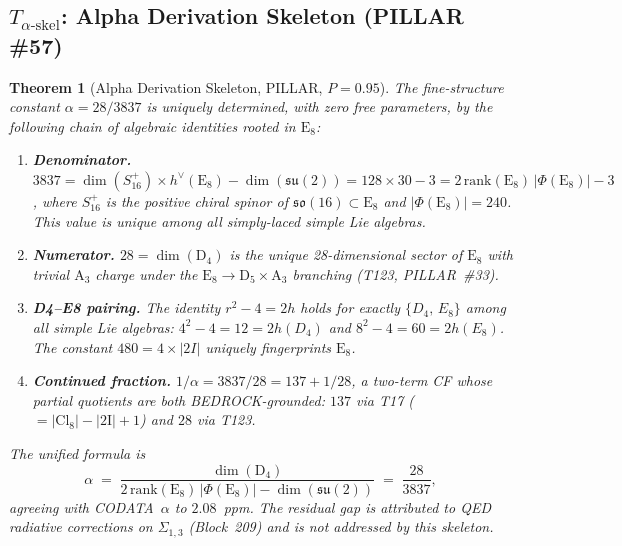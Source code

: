 \documentclass[aps,prd,twocolumn,superscriptaddress,floatfix,nofootinbib]{revtex4-2}
\newtheorem{theorem}{Theorem}
\theoremstyle{definition}
\theoremstyle{remark}
\begin{document}
\subsection{$T_{\alpha\text{-skel}}$: Alpha Derivation Skeleton (PILLAR \#57)}
\label{sec:t-alpha-skeleton}

\begin{theorem}[Alpha Derivation Skeleton, PILLAR, $P{=}0.95$]
\label{thm:t-alpha-skel}
The fine-structure constant $\alpha = 28/3837$ is uniquely determined, with
zero free parameters, by the following chain of algebraic identities rooted
in $\mathrm{E}_8$:
\begin{enumerate}
\item \textbf{Denominator.}  $3837 = \dim(S^+_{16})\times h^\vee(\mathrm{E}_8)
      - \dim(\mathfrak{su}(2)) = 128\times 30 - 3
      = 2\,\mathrm{rank}(\mathrm{E}_8)\,|\Phi(\mathrm{E}_8)| - 3$,
      where $S^+_{16}$ is the positive chiral spinor of $\mathfrak{so}(16)\subset\mathrm{E}_8$
      and $|\Phi(\mathrm{E}_8)|=240$.
      This value is unique among all simply-laced simple Lie algebras.
\item \textbf{Numerator.}  $28 = \dim(\mathrm{D}_4)$ is the unique 28-dimensional
      sector of $\mathrm{E}_8$ with trivial $\mathrm{A}_3$ charge under the
      $\mathrm{E}_8\to\mathrm{D}_5\times\mathrm{A}_3$ branching (T123, PILLAR~\#33).
\item \textbf{D4--E8 pairing.}  The identity $r^2-4 = 2h$ holds for exactly
      $\{D_4,\,E_8\}$ among all simple Lie algebras: $4^2-4=12=2h(D_4)$ and
      $8^2-4=60=2h(E_8)$.  The constant $480=4\times|2I|$ uniquely fingerprints
      $\mathrm{E}_8$.
\item \textbf{Continued fraction.}  $1/\alpha = 3837/28 = 137 + 1/28$, a
      two-term CF whose partial quotients are both BEDROCK-grounded: $137$ via
      T17 ($= |\mathrm{Cl}_8|-|\mathrm{2I}|+1$) and $28$ via T123.
\end{enumerate}
The unified formula is
\begin{equation}
\alpha \;=\; \frac{\dim(\mathrm{D}_4)}{2\,\mathrm{rank}(\mathrm{E}_8)\,|\Phi(\mathrm{E}_8)|-\dim(\mathfrak{su}(2))}
           \;=\; \frac{28}{3837},
\end{equation}
agreeing with CODATA~$\alpha$ to $2.08$~ppm.  The residual gap is attributed
to QED radiative corrections on $\Sigma_{1,3}$ (Block~209) and is not
addressed by this skeleton.
\end{theorem}
\end{document}
